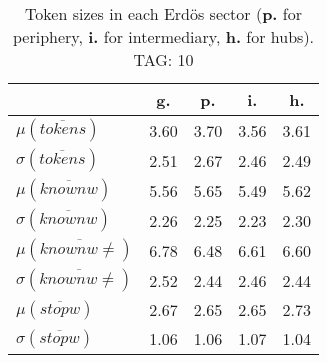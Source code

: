 \begin{table}[h!]
\begin{center}
\begin{tabular}{| l || c | c | c | c |}\hline
 & {\bf g.} & {\bf p.} & {\bf i.} & {\bf h.} \\\hline\hline
$\mu(\overline{tokens})$ & 3.60  & 3.70  & 3.56  & 3.61 \\
$\sigma(\overline{tokens})$ & 2.51  & 2.67  & 2.46  & 2.49 \\\hline
$\mu(\overline{knownw})$ & 5.56  & 5.65  & 5.49  & 5.62 \\
$\sigma(\overline{knownw})$ & 2.26  & 2.25  & 2.23  & 2.30 \\\hline
$\mu(\overline{knownw \neq})$ & 6.78  & 6.48  & 6.61  & 6.60 \\
$\sigma(\overline{knownw \neq})$ & 2.52  & 2.44  & 2.46  & 2.44 \\\hline
$\mu(\overline{stopw})$ & 2.67  & 2.65  & 2.65  & 2.73 \\
$\sigma(\overline{stopw})$ & 1.06  & 1.06  & 1.07  & 1.04 \\\hline
\end{tabular}
\caption{Token sizes in each Erd\"os sector ({{\bf p.}} for periphery, {{\bf i.}} for intermediary, {{\bf h.}} for hubs). TAG: 10}
\end{center}
\end{table}